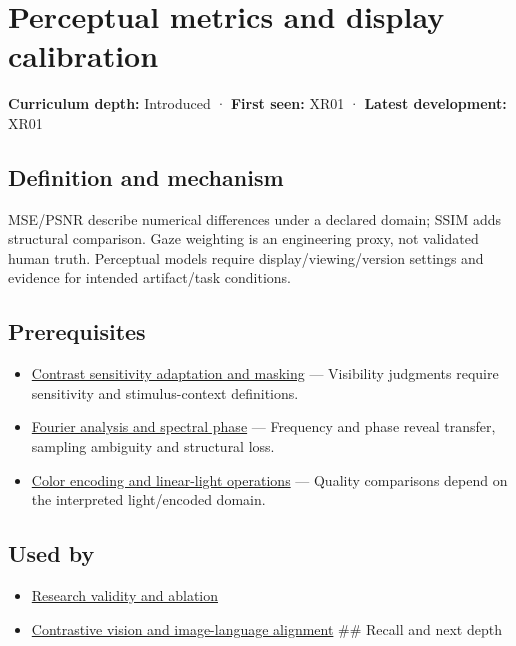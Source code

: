 \hypertarget{appendix-b2c1846508bf}{}
\section{Perceptual metrics and display calibration}\label{appendix-b2c1846508bf-perceptual-metrics-and-display-calibration}

\textbf{Curriculum depth:} Introduced · \textbf{First seen:} XR01 · \textbf{Latest development:} XR01

\subsection{Definition and mechanism}\label{appendix-b2c1846508bf-definition-and-mechanism}

MSE/PSNR describe numerical differences under a declared domain; SSIM adds structural comparison. Gaze weighting is an engineering proxy, not validated human truth. Perceptual models require display/viewing/version settings and evidence for intended artifact/task conditions.

\subsection{Prerequisites}\label{appendix-b2c1846508bf-prerequisites}

\begin{itemize}
\tightlist
\item
  \hyperref[appendix-b3aa9e8e01ad]{Contrast sensitivity adaptation and masking} --- Visibility judgments require sensitivity and stimulus-context definitions.
\item
  \hyperref[appendix-b60686ba06a1]{Fourier analysis and spectral phase} --- Frequency and phase reveal transfer, sampling ambiguity and structural loss.
\item
  \hyperref[appendix-a9f83ad40792]{Color encoding and linear-light operations} --- Quality comparisons depend on the interpreted light/encoded domain.
\end{itemize}

\subsection{Used by}\label{appendix-b2c1846508bf-used-by}

\begin{itemize}
\item
  \hyperref[appendix-65788587ef78]{Research validity and ablation}
\item
  \hyperref[appendix-772f1fd96148]{Contrastive vision and image-language alignment} \#\# Recall and next depth
\end{itemize}

